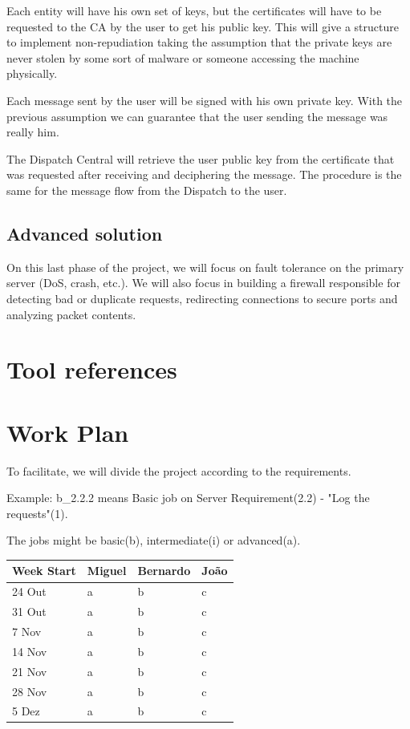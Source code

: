 \documentclass[a4paper,titlepage,11pt]{article}
\begin{document}
Each entity will have his own set of keys, but the certificates will have to be requested to the CA by the user to get his public key.        %
This will give a structure to implement non-repudiation taking the assumption that the private keys are never stolen
by some sort of malware or someone accessing the machine physically.

Each message sent by the user will be signed with his own private key.
With the previous assumption we can guarantee that the user sending the message was really him.

The Dispatch Central will retrieve the user public key from the certificate that was requested after receiving and deciphering the message.   %
The procedure is the same for the message flow from the Dispatch to the user.

\subsection{Advanced solution}
On this last phase of the project, we will focus on fault tolerance on the primary server (DoS, crash, etc.).
We will also focus in building a firewall responsible for detecting bad or duplicate requests,
redirecting connections to secure ports and analyzing packet contents.

\section{Tool references}

\section{Work Plan}
To facilitate, we will divide the project according to the requirements.

Example: b\_2.2.2 means Basic job on Server Requirement(2.2) - "Log the requests"(1). 

The jobs might be basic(b), intermediate(i) or advanced(a).
\begin{center}
    \begin{tabular}{| l || l | l | l |}
    \hline
    Week Start & Miguel & Bernardo & João \\ \hline \hline
    24 Out & a & b & c \\
    31 Out & a & b & c \\
    7 Nov & a & b & c \\
    14 Nov & a & b & c \\
    21 Nov & a & b & c \\ 
    28 Nov & a & b & c \\ 
    5 Dez & a & b & c \\ \hline

    \end{tabular}
\end{center}
\end{document}
